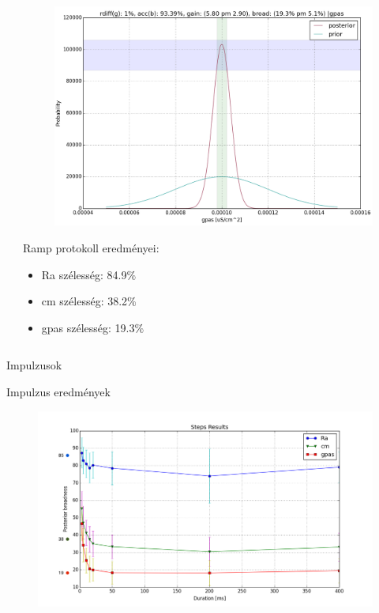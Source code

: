 \documentclass{beamer}
\begin{document}
\begin{darkframes}
\begin{frame}
\begin{columns}[T]
\begin{column}{.5\textwidth}
			\end{column}
			\begin{column}{.5\textwidth}
				\begin{figure}
					\centering
					\includegraphics[width=\textwidth]{ramp/illustration_gpas.png}
				\end{figure}

				Ramp protokoll eredményei: 
				\begin{itemize}
					\item Ra szélesség: 84.9$\%$
					\item cm szélesség: 38.2$\%$
					\item gpas szélesség: 19.3$\%$
				\end{itemize}
				
			\end{column}
		\end{columns}
	\end{frame}

\begin{frame}
\begin{center}
	\Large \alert{Impulzusok}
\end{center}
\end{frame}
	\begin{frame}{Impulzus eredmények}
		\begin{figure}
			\centering
			\includegraphics[width=\textwidth]{steps/steps_broadness.png}
		\end{figure}
	\end{frame}


\end{darkframes}
\end{document}

